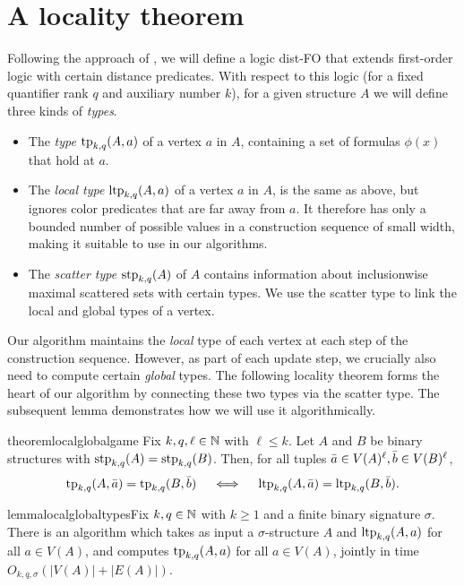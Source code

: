 \section{A locality theorem}\label{sec:logic}

Following the approach of \cite{gks},
we will define a logic dist-FO that extends first-order logic
with certain distance predicates.
With respect to this logic (for a fixed quantifier rank \(q\) and auxiliary number \(k\)),
for a given structure $A$ 
we will define three kinds of \emph{types}.

\begin{itemize}
    \item The \emph{type} \(\textnormal{tp}_{k,q}(A,a)\) of a vertex $a$ in $A$,
        containing a set of formulas $\phi(x)$ that hold at \(a\).
    \item The \emph{local type} \(\textnormal{ltp}_{k,q}(A,a)\) of a vertex $a$ in $A$,
        is the same as above, but ignores color predicates that are far away from \(a\).
        It therefore has only a bounded number of possible values in a construction sequence of small width,
        making it suitable to use in our algorithms.
    \item The \emph{scatter type} \(\textnormal{stp}_{k,q}(A)\) of \(A\)
        contains information about inclusionwise maximal scattered
        sets with certain types.
        We use the scatter type to link the local and global types of a vertex.
\end{itemize}

Our algorithm maintains the \emph{local} type of each vertex at each step of the construction sequence.
However, as part of each update step, we crucially also need to compute certain \emph{global} types.
The following locality theorem forms the heart of our algorithm by connecting these two types via the scatter type.
The subsequent lemma demonstrates how we will use it algorithmically.

\begin{restatable}{theorem}{localglobalgame}\label{thm:localglobal}
    Fix $k,q,\ell\in\mathbb N$ with $\ell\le k$.
    Let \(A\) and \(B\) be binary structures  with \(\textnormal{stp}_{k,q}(A)=\textnormal{stp}_{k,q}(B)\).
    Then, for all  tuples $\bar a\in V(A)^\ell,\bar b\in V(B)^\ell$,
    \[
       \textnormal{tp}_{k,q}(A,\bar a) = \textnormal{tp}_{k,q}(B,\bar b) \quad\iff\quad
       \textnormal{ltp}_{k,q}(A,\bar a) = \textnormal{ltp}_{k,q}(B,\bar b).
    \]
\end{restatable}

\begin{restatable}{lemma}{localglobaltypes}\label{lem:localglobaltypes}Fix $k,q\in\mathbb N$ with $k\ge 1$ and a finite binary signature $\sigma$.
    There is an algorithm which takes as input
    a $\sigma$-structure \(A\)
    and \(\textnormal{ltp}_{k,q}(A,a)\) for all \(a \in V(A)\),
    and computes
    \(\textnormal{tp}_{k,q}(A,a)\) for all \(a \in V(A)\), jointly
    in time \(O_{k,q,\sigma}(|V(A)|+|E(A)|)\).
\end{restatable}

